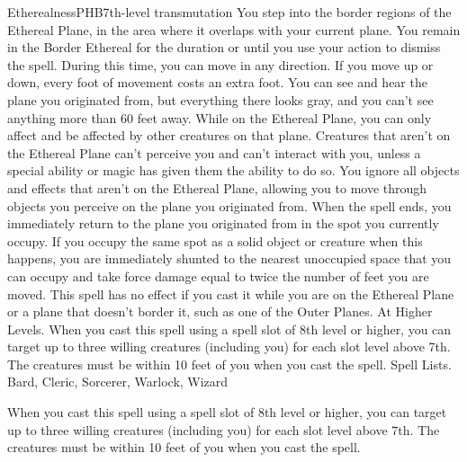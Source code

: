 \begin{spell}{Etherealness}{PHB}{7th-level transmutation}
{
}
You step into the border regions of the Ethereal Plane, in the area where it overlaps with your current plane. You remain in the Border Ethereal for the duration or until you use your action to dismiss the spell. During this time, you can move in any direction. If you move up or down, every foot of movement costs an extra foot. You can see and hear the plane you originated from, but everything there looks gray, and you can’t see anything more than 60 feet away.
While on the Ethereal Plane, you can only affect and be affected by other creatures on that plane. Creatures that aren’t on the Ethereal Plane can’t perceive you and can’t interact with you, unless a special ability or magic has given them the ability to do so.
You ignore all objects and effects that aren’t on the Ethereal Plane, allowing you to move through objects you perceive on the plane you originated from. When the spell ends, you immediately return to the plane you originated from in the spot you currently occupy. If you occupy the same spot as a solid object or creature when this happens, you are immediately shunted to the nearest unoccupied space that you can occupy and take force damage equal to twice the number of feet you are moved.
This spell has no effect if you cast it while you are on the Ethereal Plane or a plane that doesn’t border it, such as one of the Outer Planes.
At Higher Levels. When you cast this spell using a spell slot of 8th level or higher, you can target up to three willing creatures (including you) for each slot level above 7th. The creatures must be within 10 feet of you when you cast the spell.
Spell Lists. Bard, Cleric, Sorcerer, Warlock, Wizard

 When you cast this spell using a spell slot of 8th level or higher, you can target up to three willing creatures (including you) for each slot level above 7th. The creatures must be within 10 feet of you when you cast the spell.
\end{spell}

